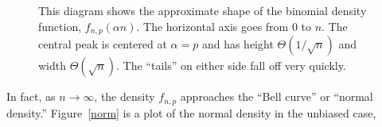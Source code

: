 \documentclass[11pt,twoside]{article}
\begin{document}
\begin{figure}
  \centerline{}
  \caption{This diagram shows the approximate shape of the binomial
    density function, $f_{n,p}(\alpha n)$.  The horizontal axis goes from
    0 to $n$.  The central peak is
    centered at $\alpha = p$ and has height
    $\Theta(1/\sqrt{n})$ and width
    $\Theta(\sqrt{n})$.  The ``tails'' on either side fall off very
    quickly.}
  \label{fig:binom}
\end{figure}

\iffalse

In fact, as $n \rightarrow \infty$, the density $f_{n,p}$ approaches the
``Bell curve'' or ``normal density.''  Figure~\ref{norm} is a plot of the
normal density in the unbiased case,
\end{document}
